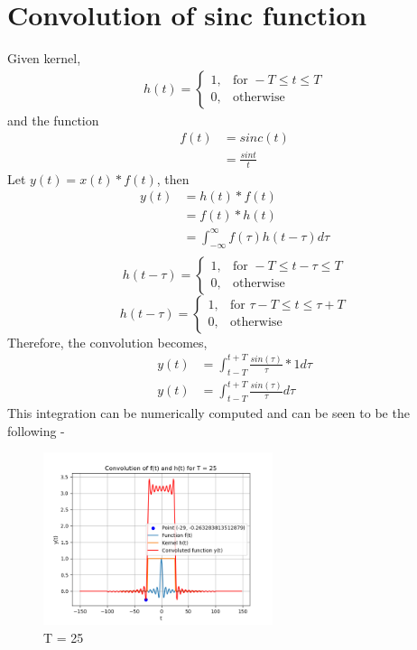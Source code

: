 \section{Convolution of sinc function}

Given kernel, 
\begin{align}
h(t) =
\begin{cases}
1, & \text{for } -T \leq t \leq T \\
0, & \text{otherwise}
\end{cases} \label{eq:kernel}
\end{align}
and the function 
\begin{align*}
f(t) &= sinc(t) \\
     &= \frac{sint}{t}
\end{align*}
Let $y(t) = x(t) * f(t)$, then
\begin{align*}
	y(t) &= h(t) * f(t) \\
             &= f(t) * h(t) \\
             &= \int_{-\infty}^{\infty} f(\tau) h(t - \tau) d \tau \\
\end{align*}
\[
h(t - \tau) =
\begin{cases}
1, & \text{for } -T \leq t - \tau \leq T \\
0, & \text{otherwise}
\end{cases}
\]
\[
h(t - \tau) =
\begin{cases}
1, & \text{for } \tau - T \leq t \leq \tau + T \\
0, & \text{otherwise}
\end{cases}
\]
Therefore, the convolution becomes, 
\begin{align*}
	y(t) &= \int_{t - T}^{t + T} \frac{sin(\tau)}{\tau} * 1 d\tau \\
	y(t) &= \int_{t - T}^{t + T} \frac{sin(\tau)}{\tau} d\tau
\end{align*}
This integration can be numerically computed and can be seen to be the following - \\
\begin{figure}[!ht]
    \centering
    \includegraphics[width=0.6\textwidth]{figs/Conv_sinc.png}
    \caption{T = 25}
    \label{fig:conv_sinc}
\end{figure}
